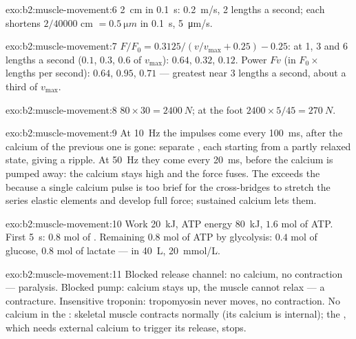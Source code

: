 \begin{solution}{exo:b2:muscle-movement:6}
\qty{2}{cm} in \qty{0.1}{s}: \qty{0.2}{m/s}, 2 lengths a second; each
 shortens $2/\num{40000}$ cm $= \qty{0.5}{\micro m}$ in
\qty{0.1}{s}, \qty{5}{\micro m/s}.
\end{solution}

\begin{solution}{exo:b2:muscle-movement:7}
$F/F_0 = 0.3125/(v/v_{\max} + 0.25) - 0.25$: at 1, 3 and 6 lengths a
second ($0.1$, $0.3$, $0.6$ of $v_{\max}$): $0.64$, $0.32$, $0.12$.
Power $Fv$ (in $F_0\times$ lengths per second): $0.64$, $0.95$, $0.71$
--- greatest near 3 lengths a second, about a third of $v_{\max}$.
\end{solution}

\begin{solution}{exo:b2:muscle-movement:8}
$80\times 30 = \qty{2400}{N}$; at the foot $2400\times 5/45 =
\qty{270}{N}$.
\end{solution}

\begin{solution}{exo:b2:muscle-movement:9}
At \qty{10}{Hz} the impulses come every \qty{100}{ms}, after the
calcium of the previous one is gone: separate , each
starting from a partly relaxed state, giving a ripple. At
\qty{50}{Hz} they come every \qty{20}{ms}, before the calcium is
pumped away: the calcium stays high and the force fuses. The
 exceeds the  because a single calcium pulse is too
brief for the cross-bridges to stretch the series elastic elements
and develop full force; sustained calcium lets them.
\end{solution}

\begin{solution}{exo:b2:muscle-movement:10}
Work \qty{20}{kJ}, ATP energy \qty{80}{kJ}, $1.6$ mol of ATP. First
\qty{5}{s}: $0.8$ mol of . Remaining $0.8$ mol of ATP
by glycolysis: $0.4$ mol of glucose, $0.8$ mol of lactate --- in
\qty{40}{L}, \qty{20}{mmol/L}.
\end{solution}

\begin{solution}{exo:b2:muscle-movement:11}
Blocked release channel: no calcium, no contraction --- paralysis.
Blocked pump: calcium stays up, the muscle cannot relax --- a
contracture. Insensitive troponin: tropomyosin never moves, no
contraction. No calcium in the : skeletal muscle contracts
normally (its calcium is internal); the , which needs
external calcium to trigger its release, stops.
\end{solution}

